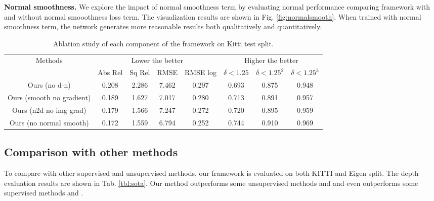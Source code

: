 \textbf{Normal smoothness.} We explore the impact of normal smoothness term by evaluating normal performance comparing framework with and without normal smooothness loss term. The visualization results are shown in Fig. \ref{fig:normalsmooth}. When trained with normal smoothness term, the network generates more reasonable results both qualitatively and quantitatively.

\begin{table*}[]
\centering
\caption{Ablation study of each component of the framework on Kitti test split.}
\label{tbl:ablation}
\bgroup
\def\arraystretch{1.2}
\begin{tabular}{|c|c|c|c|c|c|c|c|}
\hline
\multirow{2}{*}{Methods}  & \multicolumn{4}{c|}{Lower the better} & \multicolumn{3}{c|}{Higher the better}                  \\ \cline{2-8} 
                          & Abs Rel  & Sq Rel  & RMSE  & RMSE log & $\delta < 1.25$ & $\delta < 1.25^2$ & $\delta < 1.25^3$ \\ \hline
Ours (no d-n)             & 0.208    & 2.286   & 7.462 & 0.297    & 0.693           & 0.875             & 0.948             \\
Ours (smooth no gradient) & 0.189    & 1.627   & 7.017 & 0.280    & 0.713           & 0.891             & 0.957             \\
Ours (n2d no img grad)    & 0.179    & 1.566   & 7.247 & 0.272    & 0.720           & 0.895             & 0.959             \\
Ours (no normal smooth)   & 0.172    & 1.559   & 6.794 & 0.252    & 0.744           & 0.910             & 0.969             \\ \hline
\end{tabular}
\egroup
\end{table*}


\subsection{Comparison with other methods}

To compare with other supervised and unsupervised methods, our framework is evaluated on both KITTI and Eigen split. The depth evaluation results are shown in Tab. \ref{tbl:sota}. Our method outperforms some  unsupervised methods \cite{zhou2017unsupervised} and \cite{kuznietsov2017semi} and even outperforms some supervised methods \cite{eigen2014depth} and \cite{liu2016learning}. 

